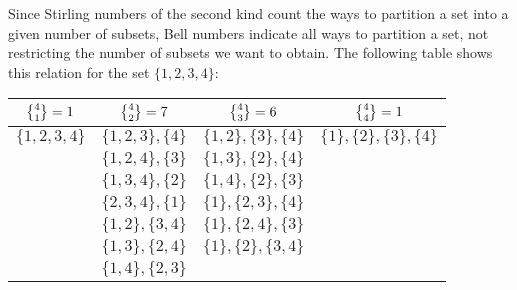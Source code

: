 \documentclass{scrreprt}
\begin{document}
Since Stirling numbers of the second kind count the ways
to partition a set into a given number of subsets,
Bell numbers indicate all ways to partition a set,
not restricting the number of subsets we want to obtain.
The following table shows this relation 
for the set $\lbrace 1,2,3,4\rbrace$:

\bgroup
\renewcommand{\arraystretch}{1.3}
\begin{center}
\begin{tabular}{|c|c|c|c|}\hline
$\stirlingTwo{4}{1} = 1$ & $\stirlingTwo{4}{2} = 7$ & 
$\stirlingTwo{4}{3} = 6$ &  $\stirlingTwo{4}{4} = 1$\\\hline\hline
$\lbrace 1,2,3,4\rbrace$ & 
$\lbrace 1,2,3\rbrace, \lbrace 4\rbrace$ & 
$\lbrace 1,2\rbrace, \lbrace 3\rbrace, \lbrace 4\rbrace$ & 
$\lbrace 1\rbrace, \lbrace 2\rbrace, \lbrace 3\rbrace, \lbrace 4\rbrace$ \\\cline{2-3}
 & 
$\lbrace 1,2,4\rbrace, \lbrace 3\rbrace$ & 
$\lbrace 1,3\rbrace, \lbrace 2\rbrace, \lbrace 4\rbrace$ & \\\cline{2-3}
 & 
$\lbrace 1,3,4\rbrace, \lbrace 2\rbrace$ & 
$\lbrace 1,4\rbrace, \lbrace 2\rbrace, \lbrace 3\rbrace$ & \\\cline{2-3}
 & 
$\lbrace 2,3,4\rbrace, \lbrace 1\rbrace$ & 
$\lbrace 1\rbrace, \lbrace 2,3\rbrace, \lbrace 4\rbrace$ & \\\cline{2-3}
 & 
$\lbrace 1,2\rbrace, \lbrace 3,4\rbrace$ & 
$\lbrace 1\rbrace, \lbrace 2,4\rbrace, \lbrace 3\rbrace$ & \\\cline{2-3}
 & 
$\lbrace 1,3\rbrace, \lbrace 2,4\rbrace$ & 
$\lbrace 1\rbrace, \lbrace 2\rbrace, \lbrace 3,4\rbrace$ &  \\\cline{2-3}
 & 
$\lbrace 1,4\rbrace, \lbrace 2,3\rbrace$ &  & \\\hline
\end{tabular}
\end{center}
\egroup
\end{document}
